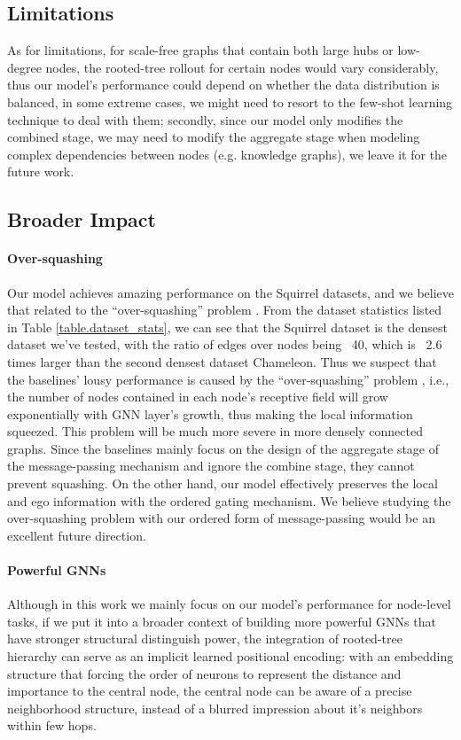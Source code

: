 \documentclass{article}
\begin{document}
\subsection{Limitations}
As for limitations, for scale-free graphs that contain both large hubs or low-degree nodes, the rooted-tree rollout for certain nodes would vary considerably, thus our model's performance could depend on whether the data distribution is balanced, in some extreme cases, we might need to resort to the few-shot learning technique to deal with them; secondly, since our model only modifies the combined stage, we may need to modify the aggregate stage when modeling complex dependencies between nodes (e.g. knowledge graphs), we leave it for the future work.

\subsection{Broader Impact}
\label{Impact}

\paragraph{Over-squashing}
Our model achieves amazing performance on the Squirrel datasets, and we believe that related to the ``over-squashing'' problem \citep{alon2020bottleneck,topping2021understanding}. From the dataset statistics listed in Table \ref{table.dataset_stats}, we can see that the Squirrel dataset is the densest dataset we've tested, with the ratio of edges over nodes being ~40, which is ~2.6 times larger than the second densest dataset Chameleon. Thus we suspect that the baselines' lousy performance is caused by the ``over-squashing'' problem \citep{alon2020bottleneck,topping2021understanding}, i.e., the number of nodes contained in each node's receptive field will grow exponentially with GNN layer's growth, thus making the local information squeezed. This problem will be much more severe in more densely connected graphs. Since the baselines mainly focus on the design of the aggregate stage of the message-passing mechanism and ignore the combine stage, they cannot prevent squashing. On the other hand, our model effectively preserves the local and ego information with the ordered gating mechanism. We believe studying the over-squashing problem with our ordered form of message-passing would be an excellent future direction.


\paragraph{Powerful GNNs}
Although in this work we mainly focus on our model's performance for node-level tasks, if we put it into a broader context of building more powerful GNNs \citep{xu2018powerful} that have stronger structural distinguish power, the integration of rooted-tree hierarchy can serve as an implicit learned positional encoding: with an embedding structure that forcing the order of neurons to represent the distance and importance to the central node, the central node can be aware of a precise neighborhood structure, instead of a blurred impression about it's neighbors within few hops.
\end{document}
